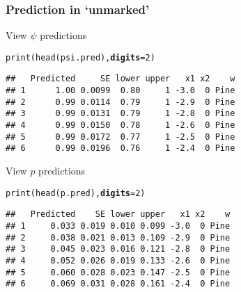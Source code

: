 \documentclass[color=usenames,dvipsnames]{beamer}\usepackage[]{graphicx}\usepackage[]{color}
\makeatletter
\newcommand{\hlnum}[1]{\textcolor[rgb]{0.69,0.494,0}{#1}}%
\newcommand{\hlstd}[1]{\textcolor[rgb]{0,0,0}{#1}}%
\newcommand{\hlkwc}[1]{\textcolor[rgb]{0,0,0}{\textbf{#1}}}%
\newcommand{\hlkwd}[1]{\textcolor[rgb]{0.004,0.004,0.506}{#1}}%
\newenvironment{kframe}{%
 \def\at@end@of@kframe{}%
 \ifinner\ifhmode%
  \def\at@end@of@kframe{\end{minipage}}%
  \begin{minipage}{\columnwidth}%
 \fi\fi%
 \def\FrameCommand##1{\hskip\@totalleftmargin \hskip-\fboxsep
 \colorbox{shadecolor}{##1}\hskip-\fboxsep
     \hskip-\linewidth \hskip-\@totalleftmargin \hskip\columnwidth}%
 \MakeFramed {\advance\hsize-\width
   \@totalleftmargin\z@ \linewidth\hsize
   \@setminipage}}%
 {\par\unskip\endMakeFramed%
 \at@end@of@kframe}
\newenvironment{knitrout}{}{} %
\makeatother
\begin{document}
\begin{frame}[fragile]
  \frametitle{Prediction in `unmarked'}
  \small
  View $\psi$ predictions
\begin{knitrout}\footnotesize
{}\color{fgcolor}\begin{kframe}
\begin{alltt}
\hlkwd{print}\hlstd{(}\hlkwd{head}\hlstd{(psi.pred),} \hlkwc{digits}\hlstd{=}\hlnum{2}\hlstd{)}
\end{alltt}
\begin{verbatim}
##   Predicted     SE lower upper   x1 x2    w
## 1      1.00 0.0099  0.80     1 -3.0  0 Pine
## 2      0.99 0.0114  0.79     1 -2.9  0 Pine
## 3      0.99 0.0131  0.79     1 -2.8  0 Pine
## 4      0.99 0.0150  0.78     1 -2.6  0 Pine
## 5      0.99 0.0172  0.77     1 -2.5  0 Pine
## 6      0.99 0.0196  0.76     1 -2.4  0 Pine
\end{verbatim}
\end{kframe}
\end{knitrout}
\pause
\vfill
  View $p$ predictions
\begin{knitrout}\footnotesize
{}\color{fgcolor}\begin{kframe}
\begin{alltt}
\hlkwd{print}\hlstd{(}\hlkwd{head}\hlstd{(p.pred),} \hlkwc{digits}\hlstd{=}\hlnum{2}\hlstd{)}
\end{alltt}
\begin{verbatim}
##   Predicted    SE lower upper   x1 x2    w
## 1     0.033 0.019 0.010 0.099 -3.0  0 Pine
## 2     0.038 0.021 0.013 0.109 -2.9  0 Pine
## 3     0.045 0.023 0.016 0.121 -2.8  0 Pine
## 4     0.052 0.026 0.019 0.133 -2.6  0 Pine
## 5     0.060 0.028 0.023 0.147 -2.5  0 Pine
## 6     0.069 0.031 0.028 0.161 -2.4  0 Pine
\end{verbatim}
\end{kframe}
\end{knitrout}
\end{frame}
\end{document}
